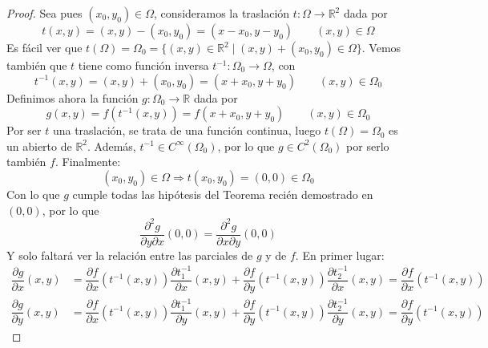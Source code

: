 \begin{teo}[de Clairaut]
\begin{proof}
        Sea pues $(x_0,y_0)\in \Omega$, consideramos la traslación $t:\Omega\rightarrow\mathbb{R}^2$ dada por
        \begin{equation*}
            t(x,y) = (x,y) - (x_0,y_0) = (x-x_0,y-y_0) \qquad (x,y)\in \Omega
        \end{equation*}
        Es fácil ver que $t(\Omega)=\Omega_0=\{(x,y)\in \mathbb{R}^2 \mid (x,y)+(x_0,y_0)\in \Omega\}$. Vemos también que $t$ tiene como función inversa $t^{-1}:\Omega_0\rightarrow\Omega$, con
        \begin{equation*}
            t^{-1}(x,y) = (x,y) + (x_0,y_0) = (x+x_0,y+y_0) \qquad (x,y)\in \Omega_0
        \end{equation*}
        Definimos ahora la función $g:\Omega_0\rightarrow\mathbb{R}$ dada por
        \begin{equation*}
            g(x,y) = f(t^{-1}(x,y)) = f(x+x_0, y+y_0) \qquad (x,y)\in \Omega_0
        \end{equation*}
        Por ser $t$ una traslación, se trata de una función continua, luego $t(\Omega) = \Omega_0$ es un abierto de $\mathbb{R}^2$. 
        Además, $t^{-1}\in C^\infty(\Omega_0)$, por lo que $g\in C^2(\Omega_0)$ por serlo también $f$. Finalmente:
        \begin{equation*}
            (x_0,y_0)\in \Omega \Longrightarrow t(x_0,y_0)=(0,0)\in \Omega_0
        \end{equation*}
        Con lo que $g$ cumple todas las hipótesis del Teorema recién demostrado en $(0,0)$, por lo que
        \begin{equation*}
            \dfrac{\partial^2 g}{\partial y\partial x}(0,0) = \dfrac{\partial^2 g}{\partial x\partial y}(0,0)
        \end{equation*}
        Y solo faltará ver la relación entre las parciales de $g$ y de $f$. En primer lugar:
        \begin{align*}
            \dfrac{\partial g}{\partial x}(x,y) &= \dfrac{\partial f}{\partial x}(t^{-1}(x,y))\dfrac{\partial t_1^{-1}}{\partial x}(x,y) + \dfrac{\partial f}{\partial y}(t^{-1}(x,y))\dfrac{\partial t_2^{-1}}{\partial x}(x,y) = \dfrac{\partial f}{\partial x}(t^{-1}(x,y)) \\
            \dfrac{\partial g}{\partial y}(x,y) &= \dfrac{\partial f}{\partial x}(t^{-1}(x,y))\dfrac{\partial t_1^{-1}}{\partial y}(x,y) + \dfrac{\partial f}{\partial y}(t^{-1}(x,y))\dfrac{\partial t_2^{-1}}{\partial y}(x,y) = \dfrac{\partial f}{\partial y}(t^{-1}(x,y)) 
        \end{align*}

\end{proof}
\end{teo}
